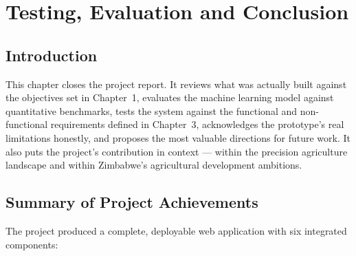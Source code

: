 \chapter{Testing, Evaluation and Conclusion}

\section{Introduction}

This chapter closes the project report. It reviews what was actually built against the objectives set in Chapter~1, evaluates the machine learning model against quantitative benchmarks, tests the system against the functional and non-functional requirements defined in Chapter~3, acknowledges the prototype's real limitations honestly, and proposes the most valuable directions for future work. It also puts the project's contribution in context — within the precision agriculture landscape and within Zimbabwe's agricultural development ambitions.

\section{Summary of Project Achievements}

The project produced a complete, deployable web application with six integrated components:

